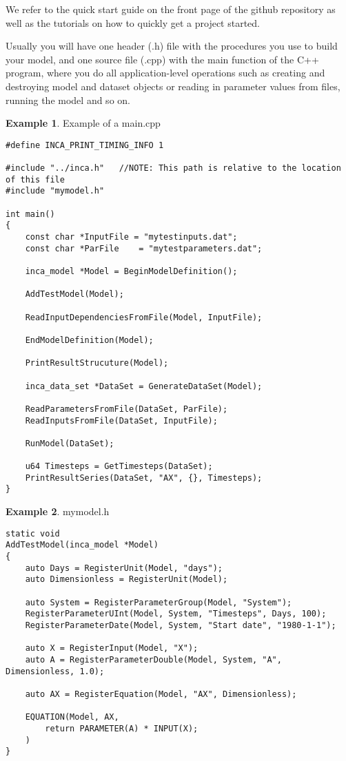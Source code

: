 \documentclass[11pt]{article}
\theoremstyle{definition}
\newtheorem{myexample}{Example}
\newenvironment{example}%
  {\begin{lrbox}{\examplebox}%
   \begin{minipage}{\dimexpr\linewidth-2\fboxsep}
   \begin{myexample}}%
  {\end{myexample}%
   \end{minipage}%
   \end{lrbox}%
   \begin{trivlist}
     \item[]\colorbox{silver}{\usebox\examplebox}
   \end{trivlist}}
\begin{document}
We refer to the quick start guide on the front page of the github repository as well as the tutorials on how to quickly get a project started.

Usually you will have one header (.h) file with the procedures you use to build your model, and one source file (.cpp) with the main function of the C++ program, where you do all application-level operations such as creating and destroying model and dataset objects or reading in parameter values from files, running the model and so on.

\begin{example}\label{ex:examplemain}
Example of a main.cpp
\begin{lstlisting}[style=mycpp]
#define INCA_PRINT_TIMING_INFO 1

#include "../inca.h"   //NOTE: This path is relative to the location of this file
#include "mymodel.h"

int main()
{
	const char *InputFile = "mytestinputs.dat";
	const char *ParFile    = "mytestparameters.dat";

	inca_model *Model = BeginModelDefinition();
	
	AddTestModel(Model);
	
	ReadInputDependenciesFromFile(Model, InputFile);

	EndModelDefinition(Model);

	PrintResultStrucuture(Model);

	inca_data_set *DataSet = GenerateDataSet(Model);

	ReadParametersFromFile(DataSet, ParFile);
	ReadInputsFromFile(DataSet, InputFile);

	RunModel(DataSet);

	u64 Timesteps = GetTimesteps(DataSet);
	PrintResultSeries(DataSet, "AX", {}, Timesteps);
}

\end{lstlisting}
\end{example}

\begin{example}
mymodel.h
\begin{lstlisting}[style=mycpp]
static void
AddTestModel(inca_model *Model)
{
	auto Days = RegisterUnit(Model, "days");
	auto Dimensionless = RegisterUnit(Model);

	auto System = RegisterParameterGroup(Model, "System");
	RegisterParameterUInt(Model, System, "Timesteps", Days, 100);
	RegisterParameterDate(Model, System, "Start date", "1980-1-1");

	auto X = RegisterInput(Model, "X");
	auto A = RegisterParameterDouble(Model, System, "A", Dimensionless, 1.0);

	auto AX = RegisterEquation(Model, "AX", Dimensionless);

	EQUATION(Model, AX,
		return PARAMETER(A) * INPUT(X);
	)
}
\end{lstlisting}
\end{example}
\end{document}
